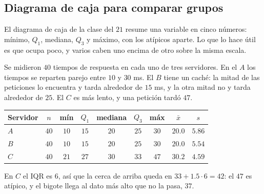 \documentclass[11pt,letterpaper]{article}
\begin{document}

\subsection*{Diagrama de caja para comparar grupos}

El diagrama de caja de la clase del $21$ resume una variable en cinco
números: mínimo, $Q_1$, mediana, $Q_3$ y máximo, con los atípicos
aparte. Lo que lo hace útil es que ocupa poco, y varios caben uno
encima de otro sobre la misma escala.

\begin{ejemplo}
    Se midieron $40$ tiempos de respuesta en cada uno de tres
    servidores. En el $A$ los tiempos se reparten parejo entre $10$ y
    $30$ ms. El $B$ tiene un caché: la mitad de las peticiones lo
    encuentra y tarda alrededor de $15$ ms, y la otra mitad no y tarda
    alrededor de $25$. El $C$ es más lento, y una petición tardó $47$.
    \begin{center}
    \small
    \begin{tabular}{lcccccccc}
        \toprule
        \textbf{Servidor} & $n$ & mín & $Q_1$ & mediana & $Q_3$ & máx
        & $\bar{x}$ & $s$ \\
        \midrule
        $A$ & $40$ & $10$ & $15$ & $20$ & $25$ & $30$ & $20.0$ & $5.86$ \\
        $B$ & $40$ & $10$ & $15$ & $20$ & $25$ & $30$ & $20.0$ & $5.54$ \\
        $C$ & $40$ & $21$ & $27$ & $30$ & $33$ & $47$ & $30.2$ & $4.59$ \\
        \bottomrule
    \end{tabular}
    \end{center}
    En $C$ el IQR es $6$, así que la cerca de arriba queda en
    $33 + 1.5 \cdot 6 = 42$: el $47$ es atípico, y el bigote llega al
    dato más alto que no la pasa, $37$.
    \begin{center}
\end{center}
\end{ejemplo}
\end{document}
